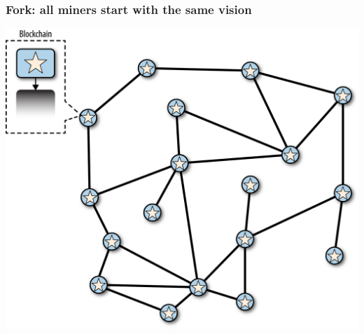 \documentclass[11pt]{beamer}  %
\begin{document}
\begin{frame}\frametitle{Fork: all miners start with the same vision}

  \begin{center}
    \includegraphics[scale=0.8,clip=false]{pictures/mbc2_1002.png}
  \end{center}

\end{frame}
\end{document}
